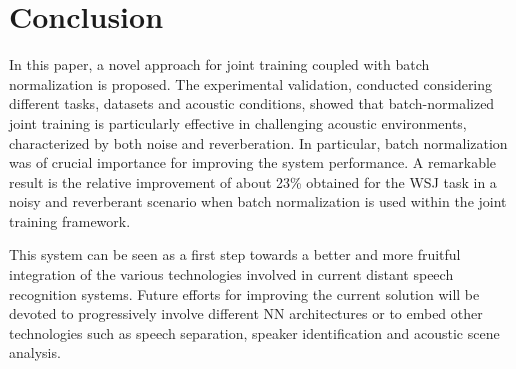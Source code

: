 \documentclass{article}
\begin{document}

\section{Conclusion}
In this paper, a novel approach for joint training coupled with batch normalization is proposed. The experimental validation, conducted considering different tasks, datasets and acoustic conditions, showed that batch-normalized joint training is particularly effective in challenging acoustic environments, characterized by both noise and reverberation. In particular, batch normalization was of crucial importance for improving the system performance. A remarkable result is the relative improvement of about 23\% obtained for the WSJ task in a noisy and reverberant scenario when batch normalization is used within the joint training framework.

This system can be seen as a first step towards a better and more fruitful integration of the various technologies involved in current distant speech recognition systems. Future efforts for improving the current solution will be devoted to progressively involve different NN architectures or to embed other technologies such as speech separation, speaker identification and acoustic scene analysis. 







\end{document}
